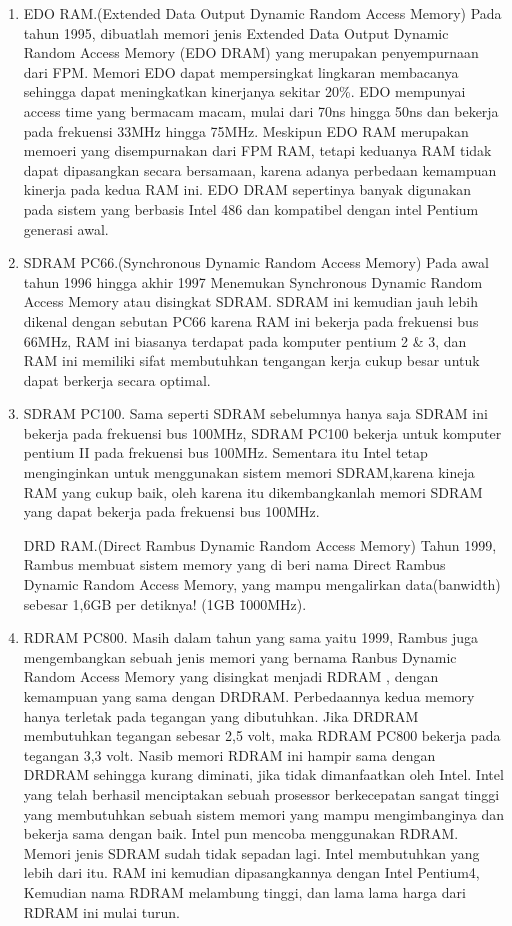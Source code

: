 \begin{enumerate}
\item EDO RAM.(Extended Data Output Dynamic Random Access Memory) Pada tahun 1995, dibuatlah memori jenis Extended Data Output Dynamic Random Access Memory (EDO DRAM) yang merupakan penyempurnaan dari FPM. Memori EDO dapat mempersingkat lingkaran membacanya sehingga dapat meningkatkan kinerjanya sekitar 20\%. EDO mempunyai access time yang bermacam macam, mulai dari 70ns hingga 50ns dan bekerja  pada frekuensi 33MHz hingga 75MHz. Meskipun EDO RAM merupakan memoeri yang disempurnakan dari FPM RAM, tetapi keduanya RAM tidak dapat dipasangkan secara bersamaan, karena adanya perbedaan kemampuan kinerja pada kedua RAM ini. EDO DRAM sepertinya banyak digunakan pada sistem yang berbasis Intel 486 dan kompatibel dengan intel Pentium generasi awal.

\item SDRAM PC66.(Synchronous Dynamic Random Access Memory) Pada awal tahun 1996 hingga akhir 1997 Menemukan Synchronous Dynamic Random Access Memory atau disingkat SDRAM. SDRAM ini kemudian jauh lebih dikenal dengan sebutan PC66 karena RAM ini bekerja pada frekuensi bus 66MHz, RAM ini biasanya terdapat pada komputer pentium 2 \& 3, dan RAM ini memiliki sifat membutuhkan tengangan kerja cukup besar untuk dapat berkerja secara optimal.

\item SDRAM PC100. Sama seperti SDRAM sebelumnya hanya saja SDRAM ini bekerja pada frekuensi bus 100MHz, SDRAM PC100 bekerja untuk komputer pentium II pada frekuensi bus 100MHz. Sementara itu Intel tetap menginginkan untuk menggunakan sistem memori SDRAM,karena kineja RAM yang cukup baik, oleh karena itu dikembangkanlah memori SDRAM yang dapat bekerja pada frekuensi bus 100MHz.

\itm DRD RAM.(Direct Rambus Dynamic Random Access Memory) Tahun 1999, Rambus membuat sistem memory yang di beri nama Direct Rambus Dynamic Random Access Memory, yang mampu mengalirkan data(banwidth) sebesar 1,6GB per detiknya! (1GB \= 1000MHz).

\item  RDRAM PC800. Masih dalam tahun yang sama yaitu 1999, Rambus juga mengembangkan sebuah jenis memori yang bernama Ranbus Dynamic Random Access Memory yang disingkat menjadi RDRAM , dengan kemampuan yang sama dengan DRDRAM. Perbedaannya kedua memory hanya terletak pada tegangan yang dibutuhkan. Jika DRDRAM membutuhkan tegangan sebesar 2,5 volt, maka RDRAM PC800 bekerja pada tegangan 3,3 volt. Nasib memori RDRAM ini hampir sama dengan DRDRAM sehingga kurang diminati, jika tidak dimanfaatkan oleh Intel. Intel yang telah berhasil menciptakan sebuah prosessor berkecepatan sangat tinggi yang membutuhkan sebuah sistem memori yang mampu mengimbanginya dan bekerja sama dengan baik. Intel pun mencoba menggunakan RDRAM. Memori jenis SDRAM sudah tidak sepadan lagi. Intel membutuhkan yang lebih dari itu. RAM ini kemudian dipasangkannya dengan Intel Pentium4, Kemudian nama RDRAM melambung tinggi, dan lama \- lama harga dari RDRAM ini mulai turun.


\end{enumerate}
